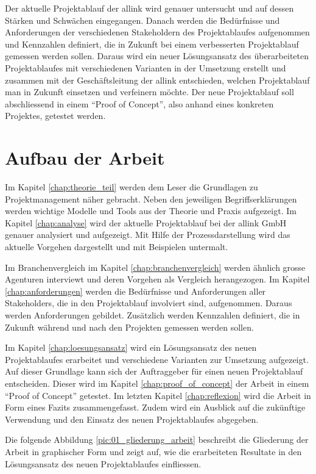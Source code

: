 Der aktuelle Projektablauf der allink wird genauer untersucht und auf 
dessen Stärken und Schwächen eingegangen. Danach werden die Bedürfnisse und 
Anforderungen der verschiedenen Stakeholdern des Projektablaufes aufgenommen und
Kennzahlen definiert, die in Zukunft bei einem verbesserten Projektablauf gemessen 
werden sollen. Daraus wird ein neuer Lösungsansatz des überarbeiteten Projektablaufes 
mit verschiedenen Varianten in der Umsetzung erstellt und zusammen mit der 
Geschäftsleitung der allink entschieden, welchen Projektablauf 
man in Zukunft einsetzen und verfeinern möchte. Der neue Projektablauf soll 
abschliessend in einem ``Proof of Concept'', also anhand eines konkreten Projektes, 
getestet werden.

\section{Aufbau der Arbeit}
Im Kapitel \ref{chap:theorie_teil} werden dem Leser die Grundlagen zu Projektmanagement 
näher gebracht. Neben den jeweiligen Begriffserklärungen werden wichtige Modelle 
und Tools aus der Theorie und Praxis aufgezeigt.
Im Kapitel \ref{chap:analyse} wird der aktuelle Projektablauf bei der allink
GmbH genauer analysiert und aufgezeigt. Mit Hilfe der Prozessdarstellung wird
das aktuelle Vorgehen dargestellt und mit Beispielen untermalt.

Im Branchenvergleich im Kapitel \ref{chap:branchenvergleich} werden ähnlich 
grosse Agenturen interviewt und deren Vorgehen als Vergleich herangezogen.
Im Kapitel \ref{chap:anforderungen} werden die Bedürfnisse und Anforderungen 
aller Stakeholders, die in den Projektablauf involviert sind, aufgenommen. Daraus werden
Anforderungen gebildet. Zusätzlich werden Kennzahlen definiert, die in Zukunft
während und nach den Projekten gemessen werden sollen.

Im Kapitel \ref{chap:loesungsansatz} wird ein Lösungsansatz des neuen Projektablaufes
erarbeitet und verschiedene Varianten zur Umsetzung aufgezeigt. Auf dieser Grundlage
kann sich der Auftraggeber für einen neuen Projektablauf entscheiden. Dieser wird
im Kapitel \ref{chap:proof_of_concept} der Arbeit in einem ``Proof of Concept'' 
getestet. Im letzten Kapitel \ref{chap:reflexion} wird die Arbeit in Form eines Fazits 
zusammengefasst. Zudem wird ein Ausblick auf die zukünftige Verwendung und den 
Einsatz des neuen Projektablaufes abgegeben.

Die folgende Abbildung \ref{pic:01_gliederung_arbeit} beschreibt die Gliederung der 
Arbeit in graphischer Form und zeigt auf, wie die erarbeiteten Resultate in
den Lösungsansatz des neuen Projektablaufes einfliessen.

